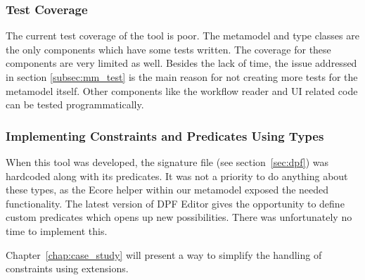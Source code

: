 \subsubsection{Test Coverage}
The current test coverage of the tool is poor. The metamodel and type classes are the only components which have some tests written. The coverage for these components are very limited as well. Besides the lack of time, the issue addressed in section \ref{subsec:mm_test} is the main reason for not creating more tests for the metamodel itself. Other components like the workflow reader and UI related code can be tested programmatically.

\subsubsection{Implementing Constraints and Predicates Using Types}\label{subsub:shortcoming_constr}
When this tool was developed, the signature file (see section~\ref{sec:dpf}) was hardcoded along with its predicates. It was not a priority to do anything about these types, as the Ecore helper within our metamodel exposed the needed functionality. The latest version of DPF Editor gives the opportunity to define custom predicates which opens up new possibilities. There was unfortunately no time to implement this.

Chapter~\ref{chap:case_study} will present a way to simplify the handling of constraints using extensions.

